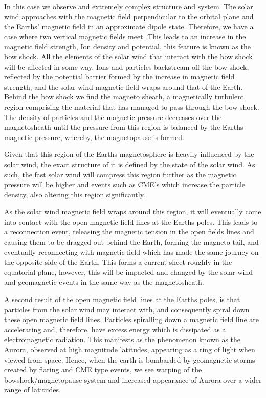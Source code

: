 In this case we observe and extremely complex structure and system.
The solar wind approaches with the magnetic field perpendicular to the orbital plane and the Earths' magnetic field in an approximate dipole state.
Therefore, we have a case where two vertical magnetic fields meet.
This leads to an increase in the magnetic field strength, Ion density and potential, this feature is known as the bow shock.
All the elements of the solar wind that interact with the bow shock will be affected in some way.
Ions and particles backstream off the bow shock, reflected by the potential barrier formed by the increase in magnetic field strength, and the solar wind magnetic field wraps around that of the Earth.
Behind the bow shock we find the magneto sheath, a magnetically turbulent region comprising the 
material that has managed to pass through the bow shock.
The density of particles and the magnetic pressure decreases over the magnetosheath until the pressure from this region is balanced by the Earths magnetic pressure, whereby, the magnetopause is formed.

Given that this region of the Earths magnetosphere is heavily influenced by the solar wind, the exact structure of it is defined by the state of the solar wind.
As such, the fast solar wind will compress this region further as the magnetic pressure will be higher and events such as CME's which increase the particle density, also altering this region significantly.

As the solar wind magnetic field wraps around this region, it will eventually come into contact with the open magnetic field lines at the Earths poles.
This leads to a reconnection event, releasing the magnetic tension in the open fields lines and causing them to be dragged out behind the Earth, forming the magneto tail, and eventually reconnecting with magnetic field which has made the same journey on the opposite side of the Earth. 
This forms a current sheet roughly in the equatorial plane, however, this will be impacted and changed by the solar wind and geomagnetic events in the same way as the magnetosheath.

A second result of the open magnetic field lines at the Earths poles, is that particles from the solar wind may interact with, and consequently spiral down these open magnetic field lines.
Particles spiralling down a magnetic field line are accelerating and, therefore, have excess energy which is dissipated as a electromagnetic radiation.
This manifests as the phenomenon known as the Aurora, observed at high magnitude latitudes, appearing as a ring of light when viewed from space.
Hence, when the earth is bombarded by geomagnetic storms created by flaring and CME type events, we see warping of the bowshock/magnetopause system and increased appearance of Aurora over a wider range of latitudes.


